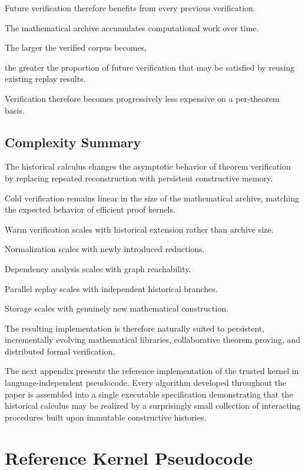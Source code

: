 \documentclass[12pt,oneside]{article}
\theoremstyle{definition}
\theoremstyle{remark}
\begin{document}
Future verification therefore benefits from every previous verification.

The mathematical archive accumulates computational work over time.

The larger the verified corpus becomes,

the greater the proportion of future verification that may be satisfied by
reusing existing replay results.

Verification therefore becomes progressively less expensive on a per-theorem
basis.


\subsection{Complexity Summary}

The historical calculus changes the asymptotic behavior of theorem verification
by replacing repeated reconstruction with persistent constructive memory.

Cold verification remains linear in the size of the mathematical archive,
matching the expected behavior of efficient proof kernels.

Warm verification scales with historical extension rather than archive size.

Normalization scales with newly introduced reductions.

Dependency analysis scales with graph reachability.

Parallel replay scales with independent historical branches.

Storage scales with genuinely new mathematical construction.

The resulting implementation is therefore naturally suited to persistent,
incrementally evolving mathematical libraries, collaborative theorem proving,
and distributed formal verification.

The next appendix presents the reference implementation of the trusted kernel in
language-independent pseudocode. Every algorithm developed throughout the paper
is assembled into a single executable specification demonstrating that the
historical calculus may be realized by a surprisingly small collection of
interacting procedures built upon immutable constructive histories.

\section{Reference Kernel Pseudocode}
\end{document}
